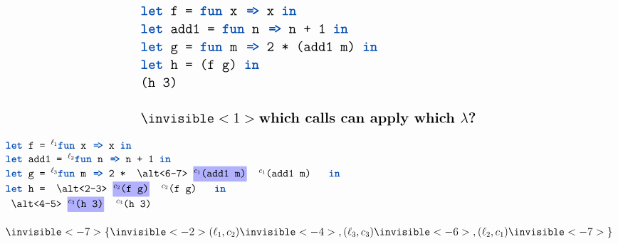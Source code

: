 \begin{frame}

  \[
  \Large
  \begin{array}{@{}ll@{}}
    \mex{\kw{let} f = \kw{fun} x \codearr x \kw{in}} \\
    \mex{\kw{let} add1 = \kw{fun} n \codearr n + 1 \kw{in}} \\
    \mex{\kw{let} g = \kw{fun} m \codearr 2 * (add1 m) \kw{in}} \\
    \mex{\kw{let} h = (f g) \kw{in}} \\
    \mex{(h 3)} \\
    \\
    \invisible<1>{\textbf{which calls can apply which \lam?}}
  \end{array}
  \]


\end{frame}

\begin{frame}

  \[
  \Large
  \begin{array}{@{}ll@{}}
    \mex{\kw{let} f = ${}^{\lambdalabel{1}}$\kw{fun} x \codearr x \kw{in}} \\
    \mex{\kw{let} add1 = ${}^{\lambdalabel{2}}$\kw{fun} n \codearr n + 1 \kw{in}} \\
    \mex{\kw{let} g = ${}^{\lambdalabel{3}}$\kw{fun} m \codearr 2 * \altcolor{6-7}{blue}{${}^{\calllabel{1}}$(add1 m)} \kw{in}} \\
    \mex{\kw{let} h = \altcolor{2-3}{blue}{${}^{\calllabel{2}}$(f g)} \kw{in}} \\
    \mex{\altcolor{4-5}{blue}{${}^{\calllabel{3}}$(h 3)}} \\
    \\
    \invisible<-7>{\{} \invisible<-2>{(\lambdalabel{1}, \calllabel{2})} \invisible<-4>{, (\lambdalabel{3}, \calllabel{3})} \invisible<-6>{, (\lambdalabel{2}, \calllabel{1})} \invisible<-7>{\}}
  \end{array}
  \]


\end{frame}

